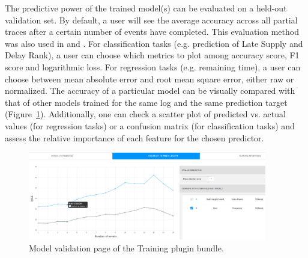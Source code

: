 \documentclass[runningheads,a4paper]{llncs}
\begin{document}
The predictive power of the trained model(s) can be evaluated on a held-out validation set. By default, a user will see the average accuracy across all partial traces after a certain number of events have completed. This evaluation method was also used in \cite{Leontjeva2015} and \cite{Teinemaa2017}. For classification tasks (e.g. prediction of Late Supply and Delay Rank), a user can choose which metrics to plot among accuracy score, F1 score and logarithmic loss. For regression tasks (e.g. remaining time), a user can choose between mean absolute error and root mean square error, either raw or normalized. The accuracy of a particular model can be visually compared with that of other models trained for the same log and the same prediction target (Figure~\ref{fig:training-evaluation}). Additionally, one can check a scatter plot of predicted vs. actual values (for regression tasks) or a confusion matrix (for classification tasks) and assess the relative importance of each feature for the chosen predictor.

\begin{figure}[t]
	\centering
	\includegraphics[width=0.93\textwidth]{img/training-evaluation}
	\caption{Model validation page of the Training plugin bundle.}
	\label{fig:training-evaluation}
\end{figure}
\end{document}
